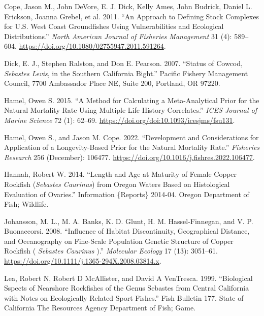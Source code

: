 \documentclass[11pt,
  english,
  letterpaper,
]{article}
\newlength{\cslhangindent}
\newenvironment{CSLReferences}[2] %
 {%
  \setlength{\parindent}{0pt}
  \ifodd #1 \everypar{\setlength{\hangindent}{\cslhangindent}}\ignorespaces\fi
  \ifnum #2 > 0
  \setlength{\parskip}{#2\baselineskip}
  \fi
 }%
 {}
\begin{document}
\begin{CSLReferences}{1}{0}
\leavevmode{}%
Cope, Jason M., John DeVore, E. J. Dick, Kelly Ames, John Budrick, Daniel L. Erickson, Joanna Grebel, et al. 2011. {``An {Approach} to {Defining} {Stock} {Complexes} for {U}.{S}. {West} {Coast} {Groundfishes} {Using} {Vulnerabilities} and {Ecological} {Distributions}.''} \emph{North American Journal of Fisheries Management} 31 (4): 589--604. \url{https://doi.org/10.1080/02755947.2011.591264}.

\leavevmode{}%
Dick, E. J., Stephen Ralston, and Don E. Pearson. 2007. {``Status of Cowcod, \emph{{Sebastes} Levis}, in the {Southern} {California} {Bight}.''} Pacific Fishery Management Council, 7700 Ambassador Place NE, Suite 200, Portland, OR 97220.

\leavevmode{}%
Hamel, Owen S. 2015. {``A Method for Calculating a Meta-Analytical Prior for the Natural Mortality Rate Using Multiple Life History Correlates.''} \emph{ICES Journal of Marine Science} 72 (1): 62--69. \url{https://doi.org/doi:10.1093/icesjms/fsu131}.

\leavevmode{}%
Hamel, Owen S., and Jason M. Cope. 2022. {``Development and Considerations for Application of a Longevity-Based Prior for the Natural Mortality Rate.''} \emph{Fisheries Research} 256 (December): 106477. \url{https://doi.org/10.1016/j.fishres.2022.106477}.

\leavevmode{}%
Hannah, Robert W. 2014. {``Length and Age at Maturity of Female Copper Rockfish (\emph{{Sebastes} Caurinus}) from {Oregon} Waters Based on Histological Evaluation of Ovaries.''} Information \{Reports\} 2014-04. Oregon Department of Fish; Wildlife.

\leavevmode{}%
Johansson, M. L., M. A. Banks, K. D. Glunt, H. M. Hassel-Finnegan, and V. P. Buonaccorsi. 2008. {``Influence of Habitat Discontinuity, Geographical Distance, and Oceanography on Fine-Scale Population Genetic Structure of Copper Rockfish ( \emph{{Sebastes} Caurinus} ).''} \emph{Molecular Ecology} 17 (13): 3051--61. \url{https://doi.org/10.1111/j.1365-294X.2008.03814.x}.

\leavevmode{}%
Lea, Robert N, Robert D McAllister, and David A VenTresca. 1999. {``Biological Sspects of Nearshore Rockfishes of the Genus Sebastes from {Central} {California} with Notes on Ecologically Related Sport Fishes.''} Fish Bulletin 177. State of California The Resources Agency Department of Fish; Game.


\end{CSLReferences}
\end{document}

